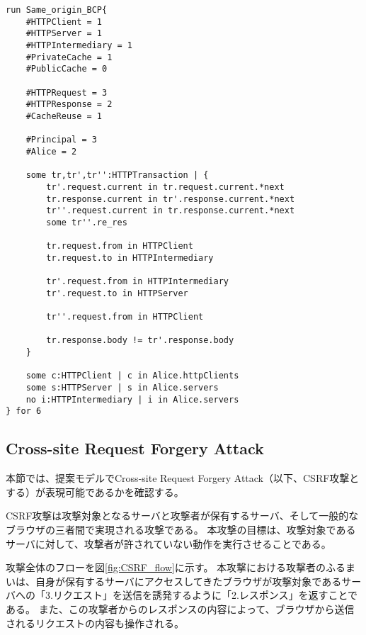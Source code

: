 \documentclass[journal]{IEEEtran}
\begin{document}
\begin{lstlisting}[caption=Same-origin BCP攻撃の表現, label=code:Same_origin_BCP]
run Same_origin_BCP{
	#HTTPClient = 1
	#HTTPServer = 1
	#HTTPIntermediary = 1
	#PrivateCache = 1
	#PublicCache = 0

	#HTTPRequest = 3
	#HTTPResponse = 2
	#CacheReuse = 1

	#Principal = 3
	#Alice = 2

	some tr,tr',tr'':HTTPTransaction | {
		tr'.request.current in tr.request.current.*next
		tr.response.current in tr'.response.current.*next
		tr''.request.current in tr.response.current.*next
		some tr''.re_res

		tr.request.from in HTTPClient
		tr.request.to in HTTPIntermediary

		tr'.request.from in HTTPIntermediary
		tr'.request.to in HTTPServer

		tr''.request.from in HTTPClient

		tr.response.body != tr'.response.body
	}

	some c:HTTPClient | c in Alice.httpClients
	some s:HTTPServer | s in Alice.servers
	no i:HTTPIntermediary | i in Alice.servers
} for 6
\end{lstlisting}

\subsection{Cross-site Request Forgery Attack}
本節では、提案モデルでCross-site Request Forgery Attack\cite{cookie-model}（以下、CSRF攻撃とする）が表現可能であるかを確認する。

CSRF攻撃は攻撃対象となるサーバと攻撃者が保有するサーバ、そして一般的なブラウザの三者間で実現される攻撃である。
本攻撃の目標は、攻撃対象であるサーバに対して、攻撃者が許されていない動作を実行させることである。

攻撃全体のフローを図\ref{fig:CSRF_flow}に示す。
本攻撃における攻撃者のふるまいは、自身が保有するサーバにアクセスしてきたブラウザが攻撃対象であるサーバへの「3.リクエスト」を送信を誘発するように「2.レスポンス」を返すことである。
また、この攻撃者からのレスポンスの内容によって、ブラウザから送信されるリクエストの内容も操作される。

\end{document}
